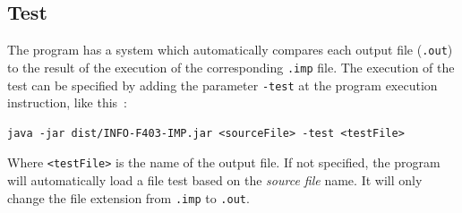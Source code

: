 \documentclass[a4paper,11pt]{article}
\begin{document}
  \subsection{Test}
    The program has a system which automatically compares each output file (\verb|.out|) to the result of the execution of the corresponding \verb|.imp| file. The execution of the test can be specified by adding the parameter \verb|-test| at the program execution instruction, like this~:
    \begin{verbatim}
java -jar dist/INFO-F403-IMP.jar <sourceFile> -test <testFile>
    \end{verbatim}
    Where \verb|<testFile>| is the name of the output file. If not specified, the program will automatically load a file test based on the \textit{source file} name. It will only change the file extension from \verb|.imp| to \verb|.out|.
    
\end{document}
